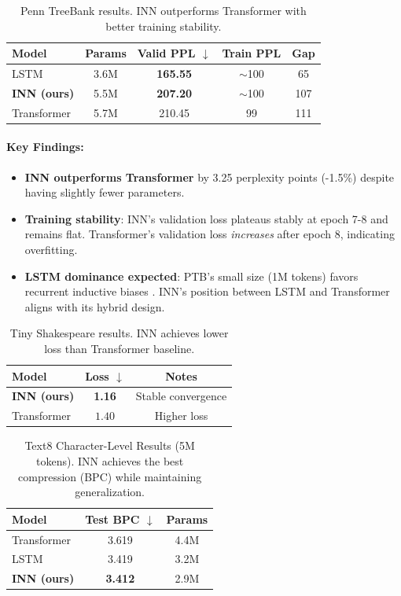 \documentclass{article}
\begin{document}
\begin{table}[h]
\centering
\caption{Penn TreeBank results. INN outperforms Transformer with better training stability.}
\begin{tabular}{lcccc}
\toprule
\textbf{Model} & \textbf{Params} & \textbf{Valid PPL} $\downarrow$ & \textbf{Train PPL} & \textbf{Gap} \\
\midrule
LSTM & 3.6M & \textbf{165.55} & $\sim$100 & 65 \\
\textbf{INN (ours)} & 5.5M & \textbf{207.20} & $\sim$100 & 107 \\
Transformer & 5.7M & 210.45 & 99 & 111 \\
\bottomrule
\end{tabular}
\label{tab:ptb_results}
\end{table}

\paragraph{Key Findings:}
\begin{itemize}
    \item \textbf{INN outperforms Transformer} by 3.25 perplexity points (-1.5\%) despite having slightly fewer parameters.
    \item \textbf{Training stability}: INN's validation loss plateaus stably at epoch 7-8 and remains flat. Transformer's validation loss \emph{increases} after epoch 8, indicating overfitting.
    \item \textbf{LSTM dominance expected}: PTB's small size (1M tokens) favors recurrent inductive biases \cite{merity2017regularizing}. INN's position between LSTM and Transformer aligns with its hybrid design.
\end{itemize}

\begin{table}[h]
\centering
\caption{Tiny Shakespeare results. INN achieves lower loss than Transformer baseline.}
\begin{tabular}{lcc}
\toprule
\textbf{Model} & \textbf{Loss} $\downarrow$ & \textbf{Notes} \\
\midrule
\textbf{INN (ours)} & \textbf{1.16} & Stable convergence \\
Transformer & $1.40$ & Higher loss \\
\bottomrule
\end{tabular}
\label{tab:shakespeare_results}
\end{table}

\begin{table}[h]
\centering
\caption{Text8 Character-Level Results (5M tokens). INN achieves the best compression (BPC) while maintaining generalization.}
\begin{tabular}{lcc}
\toprule
\textbf{Model} & \textbf{Test BPC} $\downarrow$ & \textbf{Params} \\
\midrule
Transformer & 3.619 & 4.4M \\
LSTM & 3.419 & 3.2M \\
\textbf{INN (ours)} & \textbf{3.412} & 2.9M \\
\bottomrule
\end{tabular}
\label{tab:text8_results}
\end{table}
\end{document}
